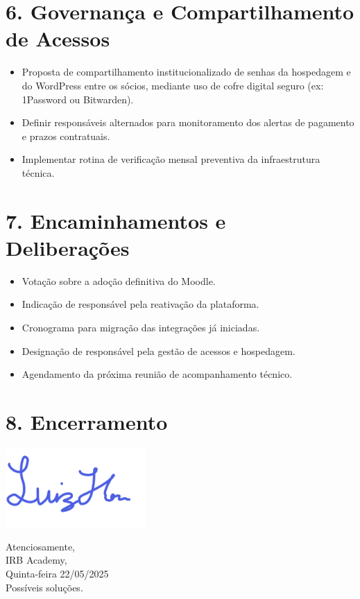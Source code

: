 \documentclass[12pt, a4paper]{letter} %
\begin{document}
\section{6. Governança e Compartilhamento de Acessos}
\begin{itemize}
	\item Proposta de compartilhamento institucionalizado de senhas da hospedagem e do WordPress entre os sócios, mediante uso de cofre digital seguro (ex: 1Password ou Bitwarden).
	\item Definir responsáveis alternados para monitoramento dos alertas de pagamento e prazos contratuais.
	\item Implementar rotina de verificação mensal preventiva da infraestrutura técnica.
\end{itemize}

\clearpage
\section{7. Encaminhamentos e Deliberações}
\begin{itemize}
	\item Votação sobre a adoção definitiva do Moodle.
	\item Indicação de responsável pela reativação da plataforma.
	\item Cronograma para migração das integrações já iniciadas.
	\item Designação de responsável pela gestão de acessos e hospedagem.
	\item Agendamento da próxima reunião de acompanhamento técnico.
\end{itemize}

\section{8. Encerramento}

\includegraphics[width=2.1in]{assiss.png}

Atenciosamente,\\
IRB Academy,\\
Quinta-feira 22/05/2025\\
Possíveis soluções.
\end{document}
